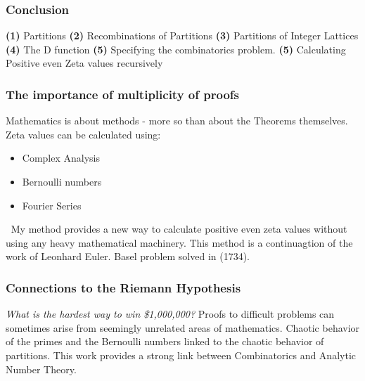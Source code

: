 \documentclass{beamer}
\begin{document}
\begin{frame}
\frametitle{Conclusion}
\textbf{(1)} Partitions
\newline \newline
\textbf{(2)} Recombinations of Partitions
\newline \newline
\textbf{(3)} Partitions of Integer Lattices
\newline \newline
\textbf{(4)} The D function
\newline \newline
\textbf{(5)} Specifying the combinatorics problem.
\newline \newline
\textbf{(5)} Calculating Positive even Zeta values recursively
\end{frame}

\begin{frame}
\frametitle{The importance of multiplicity of proofs}
Mathematics is about methods - more so than about the Theorems themselves.
Zeta values can be calculated using: \newline
\begin{itemize}
  \item Complex Analysis
  \item Bernoulli numbers
  \item Fourier Series
\end{itemize}
\(\ \)
\newline \newline
My method provides a new way to calculate positive even zeta values without using any heavy mathematical machinery.
\newline \newline
This method is a continuagtion of the work of Leonhard Euler. Basel problem solved in (1734).
\end{frame}

\begin{frame}
  \frametitle{Connections to the Riemann Hypothesis}
  \textit{What is the hardest way to win \$1,000,000?}
  \newline \newline \newline \newline \newline \newline
  Proofs to difficult problems can sometimes arise from seemingly unrelated areas of mathematics.
  \newline \newline
  Chaotic behavior of the primes and the Bernoulli numbers linked to the chaotic behavior of partitions.
  \newline \newline
  This work provides a strong link between Combinatorics and Analytic Number Theory.
\end{frame}
\end{document}
